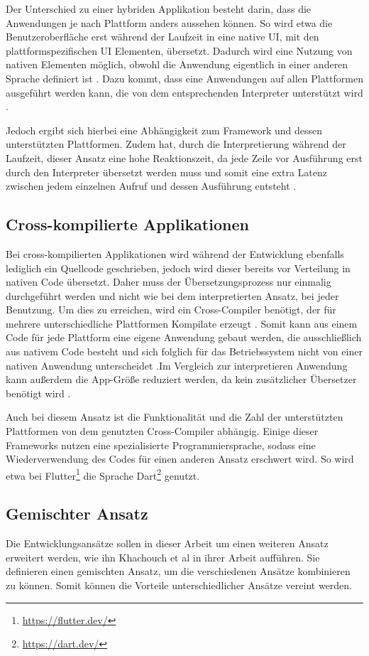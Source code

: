 Der Unterschied zu einer hybriden Applikation besteht darin, dass die Anwendungen je nach Plattform anders aussehen können. So wird etwa die Benutzeroberfläche erst während der Laufzeit in eine native UI, mit den plattformspezifischen UI Elementen, übersetzt.
Dadurch wird eine Nutzung von nativen Elementen möglich, obwohl die Anwendung eigentlich in einer anderen Sprache definiert ist \cite{IEEE_development_classes}. 
Dazu kommt, dass eine Anwendungen auf allen Plattformen ausgeführt werden kann, die von dem entsprechenden Interpreter unterstützt wird \cite{server_side}.

Jedoch ergibt sich hierbei eine Abhängigkeit zum Framework und dessen unterstützten Plattformen. Zudem hat, durch die Interpretierung während der Laufzeit, dieser Ansatz eine hohe Reaktionszeit, da jede Zeile vor Ausführung erst durch den Interpreter übersetzt werden muss und somit eine extra Latenz zwischen jedem einzelnen Aufruf und dessen Ausführung entsteht \cite{server_side}.

\subsection{Cross-kompilierte Applikationen}
Bei cross-kompilierten Applikationen wird während der Entwicklung ebenfalls lediglich ein Quellcode geschrieben, jedoch wird dieser bereits vor Verteilung in nativen Code übersetzt. Daher muss der Übersetzungsprozess nur einmalig durchgeführt werden und nicht wie bei dem interpretierten Ansatz, bei jeder Benutzung. Um dies zu erreichen, wird ein Cross-Compiler benötigt, der für mehrere unterschiedliche Plattformen Kompilate erzeugt \cite{mobiledraft_cross_plattform}. Somit kann aus einem Code für jede Plattform eine eigene Anwendung gebaut werden, die ausschließlich aus nativem Code besteht und sich folglich für das Betriebssystem nicht von einer nativen Anwendung unterscheidet \cite{IEEE_development_classes}.Im Vergleich zur interpretieren Anwendung kann außerdem die App-Größe reduziert werden, da kein zusätzlicher Übersetzer benötigt wird \cite{mobiledraft_cross_plattform}.

Auch bei diesem Ansatz ist die Funktionalität und die Zahl der unterstützten Plattformen von dem genutzten Cross-Compiler abhängig. Einige dieser Frameworks nutzen eine spezialisierte Programmiersprache, sodass eine Wiederverwendung des Codes für einen anderen Ansatz erschwert wird. So wird etwa bei Flutter\footnote{\url{https://flutter.dev/}} die Sprache Dart\footnote{\url{https://dart.dev/}} genutzt.

\subsection{Gemischter Ansatz}
Die Entwicklungsansätze sollen in dieser Arbeit um einen weiteren Ansatz erweitert werden, wie ihn Khachouch et al \cite{IEEE_Khackouch_Al} in ihrer Arbeit aufführen. Sie definieren einen gemischten Ansatz, um die verschiedenen Ansätze kombinieren zu können. Somit können die Vorteile unterschiedlicher Ansätze vereint werden.
